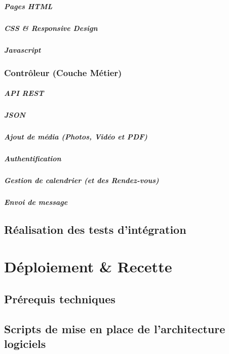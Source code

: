 \documentclass[11pt,a4paper]{report}
\begin{document}
			\paragraph{Pages HTML}
			\paragraph{CSS \& Responsive Design}
			\paragraph{Javascript}
		\subsection{Contrôleur (Couche Métier)}
			\paragraph{API REST}
			\paragraph{JSON}
			\paragraph{Ajout de média (Photos, Vidéo et PDF)}
			\paragraph{Authentification}
			\paragraph{Gestion de calendrier (et des Rendez-vous)}
			\paragraph{Envoi de message}
	\section{Réalisation des tests d'intégration}

\chapter{Déploiement \& Recette}
	\section{Prérequis techniques}
	\section{Scripts de mise en place de l'architecture logiciels}
\end{document}
